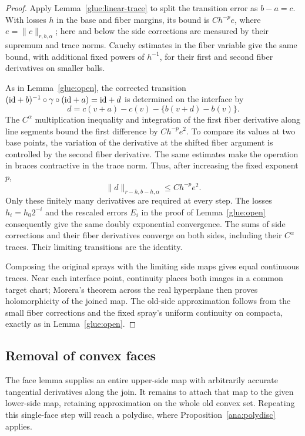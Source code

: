 \begin{proof}
Apply Lemma~\ref{glue:linear-trace} to split the transition error
as $b-a=c$. With losses $h$ in the base and fiber margins, its bound
is $Ch^{-p}e$, where $e=\|c\|_{r,b,\alpha}$; here and below the
side corrections are measured by their supremum and trace norms.
Cauchy estimates in the fiber variable give the same bound, with
additional fixed powers of $h^{-1}$, for their first and second
fiber derivatives on smaller balls.

As in Lemma~\ref{glue:open}, the corrected transition
$({\rm id}+b)^{-1}\circ\gamma\circ({\rm id}+a)={\rm id}+d$
is determined on the interface by
\[
 d=c(v+a)-c(v)-\{b(v+d)-b(v)\}.
\]
The $C^\alpha$ multiplication inequality and integration of the
first fiber derivative along line segments bound the first
difference by $Ch^{-p}e^2$. To compare its values at two base
points, the variation of the derivative at the shifted fiber
argument is controlled by the second fiber derivative. The same
estimates make the operation in braces contractive in the trace
norm. Thus, after increasing the fixed exponent $p$,
\[
                  \|d\|_{r-h,b-h,\alpha}\leq Ch^{-p}e^2.
\]
Only these finitely many derivatives are required at every step.
The losses $h_i=h_0 2^{-i}$ and the rescaled errors $E_i$ in the
proof of Lemma~\ref{glue:open} consequently give the same doubly
exponential convergence. The sums of side corrections and their
fiber derivatives converge on both sides, including their
$C^\alpha$ traces. Their limiting transitions are the identity.

Composing the original sprays with the limiting side maps gives
equal continuous traces. Near each interface point, continuity
places both images in a common target chart; Morera's theorem
across the real hyperplane then proves holomorphicity of the joined
map. The old-side approximation follows from the small fiber
corrections and the fixed spray's uniform continuity on compacta,
exactly as in Lemma~\ref{glue:open}.
\end{proof}

\subsection{Removal of convex faces}

The face lemma supplies an entire upper-side map with arbitrarily
accurate tangential derivatives along the join. It remains to attach
that map to the given lower-side map, retaining approximation on the
whole old convex set. Repeating this single-face step will reach a
polydisc, where Proposition~\ref{ana:polydisc} applies.

